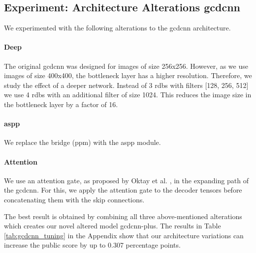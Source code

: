 

\subsection{Experiment: Architecture Alterations \acrshort{gcdcnn}}\label{section:gcdcnnplus}

We experimented with the following alterations to the \acrshort{gcdcnn} architecture. 
\paragraph{Deep} The original \acrshort{gcdcnn} was designed for images of size 256x256. However, as we use images of size 400x400, the bottleneck layer has a higher resolution. Therefore, we study the effect of a deeper network. Instead of 3 \acrshort{rdb}s with filters [128, 256, 512] we use 4 \acrshort{rdb}s with an additional filter of size 1024. This reduces the image size in the bottleneck layer by a factor of 16.
\paragraph{\acrfull{aspp}} We replace the bridge (\acrshort{ppm}) with the \acrshort{aspp} \cite{aspp_7913730} module.
\paragraph{Attention} We use an attention gate, as proposed by Oktay et al. \cite{oktay2018attention}, in the expanding path of the \acrshort{gcdcnn}. For this, we apply the attention gate to the decoder tensors before concatenating them with the skip connections.



The best result is obtained by combining all three above-mentioned alterations which creates our novel altered model \acrshort{gcdcnn}-plus. The results in Table \ref{tab:gcdcnn_tuning} in the Appendix show that our architecture variations can increase the public score by up to 0.307 percentage points.

